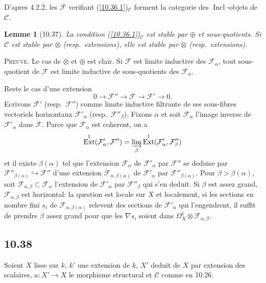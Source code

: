 \documentclass[12pt,a4paper]{article}
\theoremstyle{plain}
\newtheorem{lemma}[theorem]{Lemme}
\theoremstyle{definition}
\theoremstyle{remark}
\DeclareMathOperator{\Ext}{Ext}
\DeclareMathOperator{\Incl}{Incl}
\begin{document}
D'apres 4.2.2, les $\mathcal{F}$ verifiant (\ref{10.36.1})$_{\mathcal{C}}$ forment la categorie des $\Incl$-objets de $\mathcal{C}$.

\begin{lemma}[10.37]
La condition (\ref{10.36.1})$_{\mathcal{C}}$ est stable par $\oplus$ et sous-quotients. Si $\mathcal{C}$ est stable par $\otimes$ (resp.~extensions), elle est stable par $\otimes$ (resp.~extensions).
\end{lemma}

\textsc{Preuve.} Le cas de $\otimes$ et $\oplus$ est clair. Si $\mathcal{F}$ est limite inductive des $\mathcal{F}_\alpha$, tout sous-quotient de $\mathcal{F}$ est limite inductive de sous-quotients des $\mathcal{F}_\alpha$.

Reste le cas d'une extension
$$0 \longrightarrow \mathcal{F}'' \longrightarrow \mathcal{F} \longrightarrow \mathcal{F}' \longrightarrow 0.$$
Ecrivons $\mathcal{F}'$ (resp.~$\mathcal{F}''$) comme limite inductive filtrante de ses sous-fibres vectoriels horizontaux $\mathcal{F}'_\alpha$ (resp.~$\mathcal{F}''_\beta$). Fixons $\alpha$ et soit $\mathcal{F}_\alpha$ l'image inverse de $\mathcal{F}'_\alpha$ dans $\mathcal{F}$. Parce que $\mathcal{F}_\alpha$ est coherent, on a
$$\Ext^1(\mathcal{F}'_\alpha, \mathcal{F}'') = \varinjlim_\beta \Ext^1(\mathcal{F}'_\alpha, \mathcal{F}''_\beta)$$
et il existe $\beta(\alpha)$ tel que l'extension $\mathcal{F}_\alpha$ de $\mathcal{F}'_\alpha$ par $\mathcal{F}''$ se deduise par $\mathcal{F}''_{\beta(\alpha)} \hookrightarrow \mathcal{F}''$ d'une extension $\mathcal{F}_{\alpha, \beta(\alpha)}$ de $\mathcal{F}'_\alpha$ par $\mathcal{F}''_{\beta(\alpha)}$. Pour $\beta > \beta(\alpha)$, soit $\mathcal{F}_{\alpha, \beta} \subset \mathcal{F}_\alpha$ l'extension de $\mathcal{F}'_\alpha$ par $\mathcal{F}''_\beta$ qui s'en deduit. Si $\beta$ est assez grand, $\mathcal{F}_{\alpha, \beta}$ est horizontal: la question est locale sur $X$ et localement, si les sections en nombre fini $s_i$ de $\mathcal{F}_{\alpha, \beta(\alpha)}$ relevent des sections de $\mathcal{F}'_\alpha$ qui l'engendrent, il suffit de prendre $\beta$ assez grand pour que les $\nabla s_i$ soient dans $\Omega^1_X \otimes \mathcal{F}_{\alpha, \beta}$.

\subsection*{10.38}

Soient $X$ lisse sur $k$, $k'$ une extension de $k$, $X'$ deduit de $X$ par extension des scalaires, $a: X' \to X$ le morphisme structural et $\mathcal{C}$ comme en 10.26.
\end{document}
